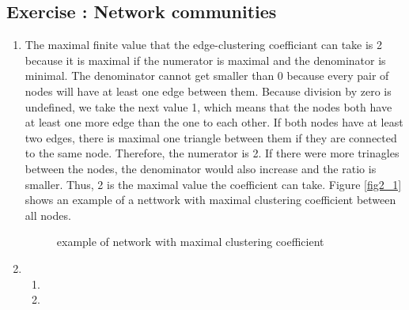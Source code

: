 \documentclass[10pt,a4paper]{article}
\newcommand{\exercise}[1]
{
  \stepcounter{subsection}
  \subsection*{Exercise \thesubsection: #1}

}
\begin{document}
\exercise{Network communities}
\begin{enumerate}
\item The maximal finite value that the edge-clustering coefficiant can take is 2 because it is maximal if the numerator is maximal and the denominator is minimal. The denominator cannot get smaller than 0 because every pair of nodes will have at least one edge between them. Because division by zero is undefined, we take the next value 1, which means that the nodes both have at least one more edge than the one to each other. If both nodes have at least two edges, there is maximal one triangle between them if they are connected to the same node. Therefore, the numerator is 2. If there were more trinagles between the nodes, the denominator would also increase and the ratio is smaller. Thus, 2 is the maximal value the coefficient can take. Figure \ref{fig2_1} shows an example of a nettwork with maximal clustering coefficient between all nodes.\\
\newline
\begin{figure}
\begin{center}
\caption{example of network with maximal clustering coefficient}
\end{center}
\end{figure}

\item
\begin{enumerate}
\item
\item
\end{enumerate}
\end{enumerate}
\end{document}
